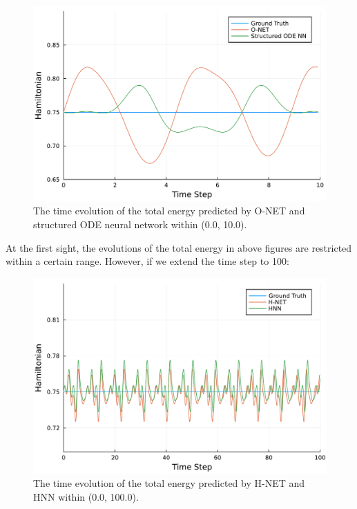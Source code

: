 \documentclass[
	parskip, 			   %
	twoside, 			   %
	DIV=14, 			   %
	BCOR=15.0mm, 		   %
	headsepline, 		   %
	open=right, 		   %
	captions=tableheading, %
	bibliography=totoc,    %
	numbers=noenddot       %
]{scrreprt}
\begin{document}
\clearpage
\begin{figure}[h!]
    \centering
    \includegraphics[scale=0.5]{figures/Hamiltonian_evolution_O_NET_and_structured_ODE_NN.pdf}
    \caption{The time evolution of the total energy predicted by O-NET and structured ODE neural network within (0.0, 10.0).}
    \label{fig:Hamiltonian_evolution_O_NET_and_structured_ODE_NN}
\end{figure}

At the first sight, the evolutions of the total energy in above figures are restricted within a certain range. However, if we extend the time step to 100:

\begin{figure}[h!]
    \centering
    \includegraphics[scale=0.5]{figures/Hamiltonian_evolution_long_H_NET_and_HNN.pdf}
    \caption{The time evolution of the total energy predicted by H-NET and HNN within (0.0, 100.0).}
    \label{fig:Hamiltonian_evolution_long_H_NET_and_HNN}
\end{figure}
\end{document}
